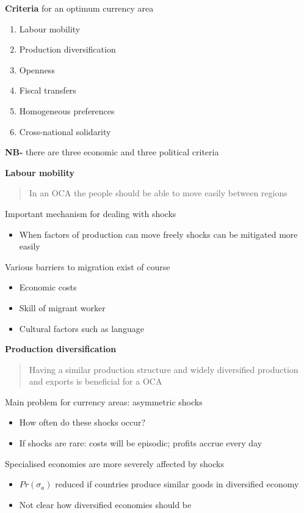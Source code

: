 \documentclass{beamer}
\begin{document}
\begin{frame}
 \textbf{Criteria} for an optimum currency area  
  \begin{enumerate}
    \item Labour mobility
    \item Production diversification
    \item Openness
    \item Fiscal transfers
    \item Homogeneous preferences
    \item Cross-national solidarity
  \end{enumerate}
  \medskip
  \textbf{NB-} there are three economic and three political criteria
\end{frame}

\begin{frame}
  \textbf{Labour mobility} 
  \begin{quote}
    In an OCA the people should be able to move easily between regions
  \end{quote}
  \medskip
  Important mechanism for dealing with shocks  
  \begin{itemize}
    \item When factors of production can move freely shocks can be mitigated more easily
  \end{itemize}
  \medskip
  Various barriers to migration exist of course
  \begin{itemize}
    \item Economic costs
    \item Skill of migrant worker
    \item Cultural factors such as language    
  \end{itemize}
\end{frame}

\begin{frame}
  \textbf{Production diversification}
  \begin{quote}
    Having a similar production structure and widely diversified production and exports is beneficial for a OCA
  \end{quote}
  \medskip
  Main problem for currency areas: asymmetric shocks
  \begin{itemize}
    \item How often do these shocks occur?
    \item If shocks are rare: costs will be episodic; profits accrue every day    
  \end{itemize}
  \medskip
    Specialised economies are more severely affected by shocks
  \begin{itemize}
    \item $Pr(\sigma_a)$ reduced if countries produce similar goods in diversified economy
    \item Not clear how diversified economies should be
  \end{itemize}
\end{frame}
\end{document}
